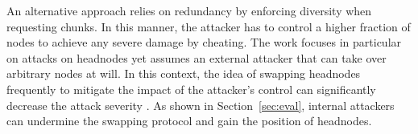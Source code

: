 An alternative approach \cite{nguyen2014resilience} relies on redundancy by enforcing diversity when requesting chunks. 
In this manner, the attacker has to control a higher fraction of nodes to achieve any severe damage by cheating.
The work focuses in particular on attacks on headnodes yet assumes an external attacker that can take over arbitrary nodes at will.
In this context, the idea of swapping headnodes frequently to mitigate the impact of the attacker's control can significantly decrease the attack severity \cite{nguyen2016swap}.
As shown in Section~\ref{sec:eval}, internal attackers can undermine the swapping protocol and gain the position of headnodes.  
